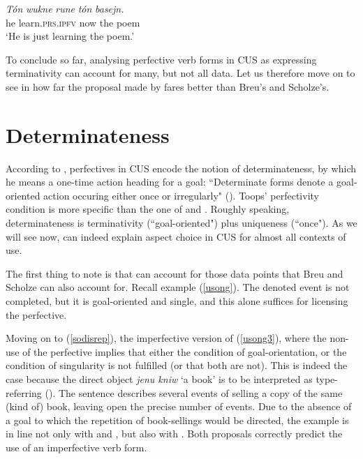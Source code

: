 \documentclass[output=paper,colorlinks,citecolor=brown]{langscibook}
\begin{document}
 \ea\label{soipfpoem}
\gll \textit{T\'on} \textit{wukne} \textit{rune} \textit{t\'on} \textit{basejn.} \\
he learn.\textsc{prs.ipfv} now the poem\\
\glt \normalsize{`He is just learning the poem.'}
\z

\noindent To conclude so far, analysing perfective verb forms in CUS as expressing terminativity can account for many, but not all data. Let us therefore move on to see in how far the proposal made by \citet{Toops2001} fares better than Breu's and Scholze's.   

\section{Determinateness}\label{mueller:sec:det}
According to \citet{Toops2001}, perfectives in CUS encode the notion of determinateness, by which he means a one-time action heading for a goal: ``Determinate forms denote a goal-oriented action occuring either once or irregularly" (\citealt[132]{Toops2001}). 
Toops' perfectivity condition is more specific than the one of \citet{Breu2000} and \citet{Scholze2008}. Roughly speaking, determinateness is terminativity (``goal-oriented") plus uniqueness (``once").
As we will see now, \citet{Toops2001} can indeed explain aspect choice in CUS for almost all contexts of use.  

The first thing to note is that \citet{Toops2001} can account for those data points that Breu and Scholze can also account for. Recall example (\ref{usong}). The denoted event is not completed, but it is goal-oriented and single, and this alone suffices for licensing the perfective.


Moving on to (\ref{sodisrep}), the imperfective version of (\ref{usong3}), where the non-use of the perfective implies that either the condition of goal-orientation, or the condition of singularity is not fulfilled (or that both are not). This is indeed the case because the direct object \textit{jenu kniw} `a book' is to be interpreted as type-referring (\citealt[69]{Rakhilina2000}).
The sentence describes several events of selling a copy of the same (kind of) book, leaving open the precise number of events. 
Due to the absence of a goal to which the repetition of book-sellings would be directed, the example is in line not only with \citet{Breu2000,Breu2012} and \citet{Scholze2008}, but also with  \citet{Toops2001}. Both proposals correctly predict the use of an imperfective verb form.  
\end{document}
